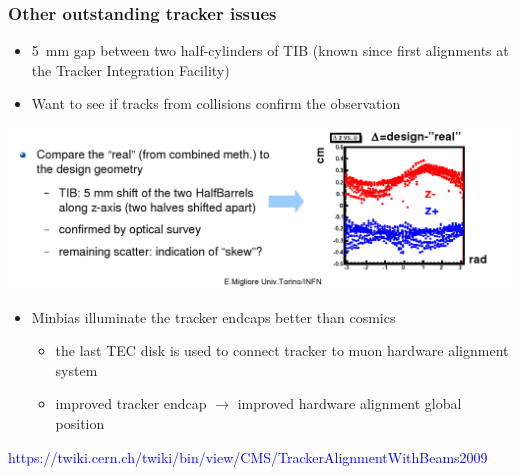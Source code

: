 \documentclass[compress]{beamer}
\begin{document}
\begin{frame}
\frametitle{Other outstanding tracker issues}

\begin{itemize}
\item 5~mm gap between two half-cylinders of TIB (known since first alignments at the Tracker Integration Facility)

\item Want to see if tracks from collisions confirm the observation
\end{itemize}

\includegraphics[width=\linewidth]{tib_gap.png}

\begin{itemize}
\item Minbias illuminate the tracker endcaps better than cosmics
\begin{itemize}
\item the last TEC disk is used to connect tracker to muon hardware alignment system
\item improved tracker endcap $\to$ improved hardware alignment global position
\end{itemize}
\end{itemize}

\textcolor{blue}{\scriptsize https://twiki.cern.ch/twiki/bin/view/CMS/TrackerAlignmentWithBeams2009}
\end{frame}
\end{document}
